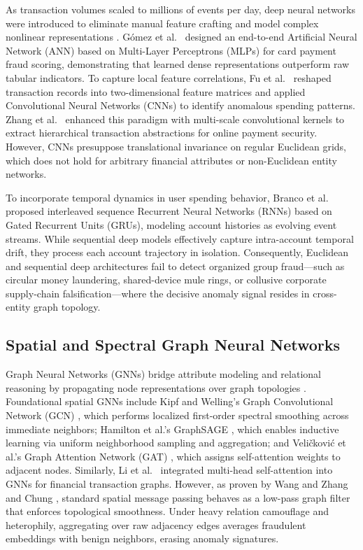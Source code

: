 \documentclass[10pt,a4paper,twocolumn]{article}
\begin{document}
As transaction volumes scaled to millions of events per day, deep neural networks were introduced to eliminate manual feature crafting and model complex nonlinear representations \cite{ref6,ref37}. G\'{o}mez et al.\ \cite{ref24} designed an end-to-end Artificial Neural Network (ANN) based on Multi-Layer Perceptrons (MLPs) for card payment fraud scoring, demonstrating that learned dense representations outperform raw tabular indicators. To capture local feature correlations, Fu et al.\ \cite{ref25} reshaped transaction records into two-dimensional feature matrices and applied Convolutional Neural Networks (CNNs) to identify anomalous spending patterns. Zhang et al.\ \cite{ref26} enhanced this paradigm with multi-scale convolutional kernels to extract hierarchical transaction abstractions for online payment security. However, CNNs presuppose translational invariance on regular Euclidean grids, which does not hold for arbitrary financial attributes or non-Euclidean entity networks.

To incorporate temporal dynamics in user spending behavior, Branco et al.\ \cite{ref27} proposed interleaved sequence Recurrent Neural Networks (RNNs) based on Gated Recurrent Units (GRUs), modeling account histories as evolving event streams. While sequential deep models effectively capture intra-account temporal drift, they process each account trajectory in isolation. Consequently, Euclidean and sequential deep architectures fail to detect organized group fraud---such as circular money laundering, shared-device mule rings, or collusive corporate supply-chain falsification---where the decisive anomaly signal resides in cross-entity graph topology.

\subsection{Spatial and Spectral Graph Neural Networks}

Graph Neural Networks (GNNs) bridge attribute modeling and relational reasoning by propagating node representations over graph topologies \cite{ref2,ref3,ref7,ref28}. Foundational spatial GNNs include Kipf and Welling's Graph Convolutional Network (GCN) \cite{ref45}, which performs localized first-order spectral smoothing across immediate neighbors; Hamilton et al.'s GraphSAGE \cite{ref46}, which enables inductive learning via uniform neighborhood sampling and aggregation; and Veli\v{c}kovi\'{c} et al.'s Graph Attention Network (GAT) \cite{ref47}, which assigns self-attention weights to adjacent nodes. Similarly, Li et al.\ \cite{ref29} integrated multi-head self-attention into GNNs for financial transaction graphs. However, as proven by Wang and Zhang \cite{ref13} and Chung \cite{ref33}, standard spatial message passing behaves as a low-pass graph filter that enforces topological smoothness. Under heavy relation camouflage and heterophily, aggregating over raw adjacency edges averages fraudulent embeddings with benign neighbors, erasing anomaly signatures.
\end{document}
